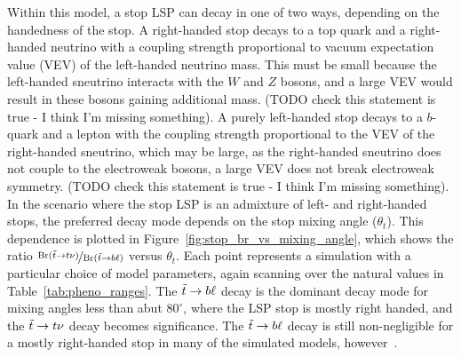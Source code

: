 Within this model, a stop LSP can decay in one of two ways, depending on
the handedness of the stop.
A right-handed stop decays to a top quark and a right-handed neutrino with a
coupling strength proportional to vacuum expectation value (VEV) of the
left-handed neutrino mass.
This must be small because the left-handed sneutrino interacts with the
$W$ and $Z$ bosons, and a large VEV would result in these bosons gaining
additional mass.
{\color{red} (TODO check this statement is true - I think I'm missing
something).}
A purely left-handed stop decays to a $b$-quark and a lepton with the coupling
strength proportional to the VEV of the right-handed sneutrino, which may be
large, as the right-handed sneutrino does not couple to the electroweak bosons,
a large VEV does not break electroweak symmetry.
{\color{red} (TODO check this statement is true - I think I'm missing
something)}.
In the scenario where the stop LSP is an admixture of left- and right-handed
stops, the preferred decay mode depends on the stop mixing angle ($\theta_t$).
This dependence is plotted in Figure~\ref{fig:stop_br_vs_mixing_angle}, which
shows the ratio
$\nicefrac{\mathrm{Br}(\tilde{t} \rightarrow t\nu)}{\mathrm{Br}(\tilde{t} \rightarrow b\ell)}$
versus $\theta_t$.
Each point represents a simulation with a particular choice of model parameters,
again scanning over the natural values in Table~\ref{tab:pheno_ranges}.
The $\tilde{t} \rightarrow b\ell$ decay is the dominant decay mode for mixing angles less
than abut $80^{\circ}$, where the LSP stop is mostly right handed, and the
$\tilde{t} \rightarrow t\nu$ decay becomes significance.
The $\tilde{t} \rightarrow b\ell$ decay is still non-negligible for a mostly right-handed
stop in many of the simulated models,
however~\cite{Marshall:2014cwa,Marshall:2014kea}.

